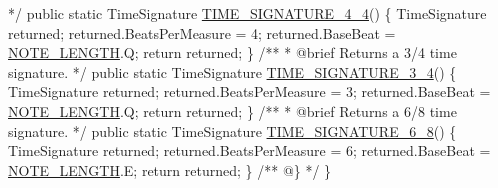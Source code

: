 \begin{DoxyCodeInclude}
\textcolor{comment}{    */}
    \textcolor{keyword}{public} \textcolor{keyword}{static} TimeSignature \hyperlink{group___music_stat_func_gac95af323eef7511543c799154e1c29fd}{TIME\_SIGNATURE\_4\_4}()
    \{
        TimeSignature returned;
        returned.BeatsPerMeasure = 4;
        returned.BaseBeat = \hyperlink{group___music_enums_gaf11b5f079adbb21c800b9eca1c5c3cbd}{NOTE\_LENGTH}.Q;
        \textcolor{keywordflow}{return} returned;
    \}
\textcolor{comment}{}
\textcolor{comment}{    /**}
\textcolor{comment}{     * @brief Returns a 3/4 time signature.}
\textcolor{comment}{    */}
    \textcolor{keyword}{public} \textcolor{keyword}{static} TimeSignature \hyperlink{group___music_stat_func_ga0392e239cbd45a23e5f76f88d0b4c152}{TIME\_SIGNATURE\_3\_4}()
    \{
        TimeSignature returned;
        returned.BeatsPerMeasure = 3;
        returned.BaseBeat = \hyperlink{group___music_enums_gaf11b5f079adbb21c800b9eca1c5c3cbd}{NOTE\_LENGTH}.Q;
        \textcolor{keywordflow}{return} returned;
    \}
\textcolor{comment}{}
\textcolor{comment}{    /**}
\textcolor{comment}{     * @brief Returns a 6/8 time signature.}
\textcolor{comment}{    */}
    \textcolor{keyword}{public} \textcolor{keyword}{static} TimeSignature \hyperlink{group___music_stat_func_gabfda54cf40e32a4299de5a2fde753347}{TIME\_SIGNATURE\_6\_8}()
    \{
        TimeSignature returned;
        returned.BeatsPerMeasure = 6;
        returned.BaseBeat = \hyperlink{group___music_enums_gaf11b5f079adbb21c800b9eca1c5c3cbd}{NOTE\_LENGTH}.E;
        \textcolor{keywordflow}{return} returned;
    \}\textcolor{comment}{}
\textcolor{comment}{    /** @\} */}
\}
\end{DoxyCodeInclude}
 